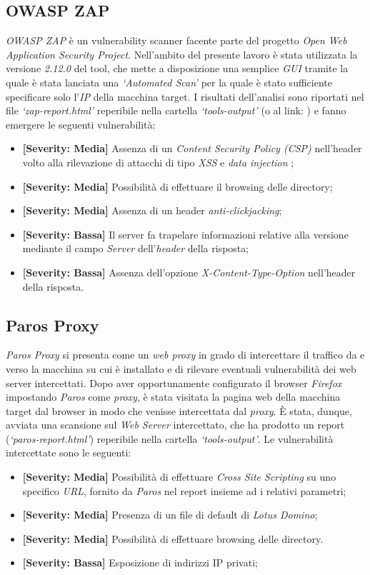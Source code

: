 \subsection{OWASP ZAP}
\emph{OWASP ZAP} è un vulnerability scanner facente parte del progetto \emph{Open Web Application Security Project}. Nell'ambito del presente lavoro è stata utilizzata la versione \emph{2.12.0} del tool, che mette a disposizione una semplice \emph{GUI} tramite la quale è stata lanciata una \emph{`Automated Scan'} per la quale è stato sufficiente specificare solo l'\emph{IP} della macchina target. I risultati dell'analisi sono riportati nel file \emph{`zap-report.html'} reperibile nella cartella \emph{`tools-output'} (o al link: ) e fanno emergere le seguenti vulnerabilità:
\begin{itemize}
    \item \textbf{[Severity: Media]} Assenza di un \emph{Content Security Policy (CSP)} nell'header volto alla rilevazione di attacchi di tipo \emph{XSS} e \emph{data injection} \cite{csp};
    \item \textbf{[Severity: Media]} Possibilità di effettuare il browsing delle directory;
    \item \textbf{[Severity: Media]} Assenza di un header \emph{anti-clickjacking};
    \item \textbf{[Severity: Bassa]} Il server fa trapelare informazioni relative alla versione mediante il campo \emph{Server} dell'\emph{header} della risposta;
    \item \textbf{[Severity: Bassa]} Assenza dell'opzione \emph{X-Content-Type-Option} nell'header della risposta.
\end{itemize}
\subsection{Paros Proxy}
\emph{Paros Proxy} si presenta come un \emph{web proxy} in grado di intercettare il traffico da e verso la macchina su cui è installato e di rilevare eventuali vulnerabilità dei web server intercettati. Dopo aver opportunamente configurato il browser \emph{Firefox} impostando \emph{Paros} come \emph{proxy}, è stata visitata la pagina web della macchina target dal browser in modo che venisse intercettata dal \emph{proxy}. È stata, dunque, avviata una scansione sul \emph{Web Server} intercettato, che ha prodotto un report (\emph{`paros-report.html'}) reperibile nella cartella \emph{`tools-output'}. Le vulnerabilità intercettate sono le seguenti:
\begin{itemize}
    \item \textbf{[Severity: Media]} Possibilità di effettuare \emph{Cross Site Scripting} su uno specifico \emph{URL}, fornito da \emph{Paros} nel report insieme ad i relativi parametri;
    \item \textbf{[Severity: Media]} Presenza di un file di default di \emph{Lotus Domino};
    \item \textbf{[Severity: Media]} Possibilità di effettuare browsing delle directory.
    \item \textbf{[Severity: Bassa]} Esposizione di indirizzi IP privati;
\end{itemize} 
